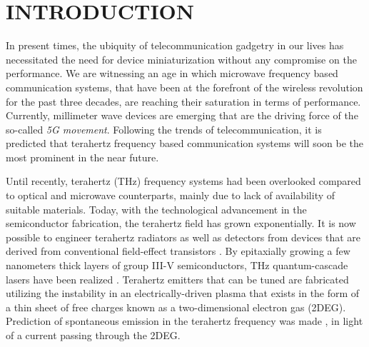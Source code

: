 %
%
%



\pagestyle{plain} %
\setcounter{page}{1}


\chapter{\uppercase {Introduction}}

In present times, the ubiquity of telecommunication gadgetry in our lives has necessitated the need for device miniaturization without any compromise on the performance. We are witnessing an age in which microwave frequency based communication systems, that have been at the forefront of the wireless revolution for the past three decades, are reaching their saturation in terms of performance. Currently, millimeter wave devices are emerging that are the driving force of the so-called \emph{5G movement}. Following the trends of telecommunication, it is predicted that terahertz frequency based communication systems will soon be the most prominent in the near future.

Until recently, terahertz (THz) frequency systems had been overlooked compared to optical and microwave counterparts, mainly due to lack of availability of suitable materials. Today, with the technological advancement in the semiconductor fabrication, the terahertz field has grown exponentially. It is now possible to engineer terahertz radiators as well as detectors from devices that are derived from conventional field-effect transistors \cite{Kempa1991,Dyakonov1993,Dyakonov2001}. By epitaxially growing a few nanometers thick layers of group III-V semiconductors, THz quantum-cascade lasers have been realized \cite{Williams2003}. Terahertz emitters that can be tuned are fabricated utilizing the instability in an electrically-driven plasma \cite{Krasheninnikov1980} that exists in the form of a thin sheet of free charges known as a two-dimensional electron gas (2DEG). Prediction of spontaneous emission in the terahertz frequency was made \cite{Kempa1991}, in light of a current passing through the 2DEG.

